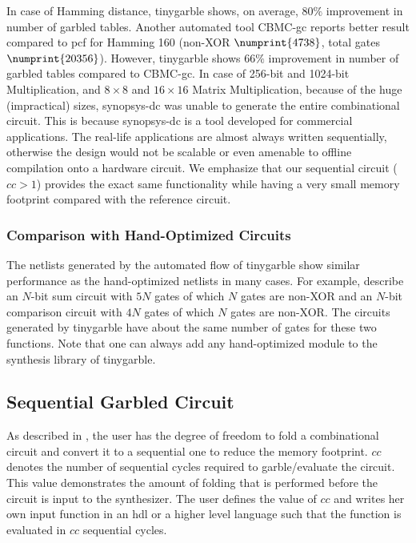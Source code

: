 In case of Hamming distance, \gls{tinygarble} shows, on average, $80\%$ improvement in number of garbled tables.
Another automated tool CBMC-\acrshort{gc} \cite{franz2014cbmc} reports better result compared to \gls{pcf} for Hamming 160 (non-XOR $\numprint{4738}$, total gates $\numprint{20356}$).
However, \gls{tinygarble} shows $66\%$ improvement in number of garbled tables compared to CBMC-\acrshort{gc}.
In case of 256-bit and 1024-bit Multiplication, and $8\times 8$ and $16\times 16$ Matrix Multiplication, because of the huge (impractical) sizes, \gls{synopsys-dc} was unable to generate the entire combinational circuit.
This is because \gls{synopsys-dc} is a tool developed for commercial applications.
The real-life applications are almost always written sequentially, otherwise the design would not be scalable or even amenable to offline compilation onto a hardware circuit.
We emphasize that our sequential circuit ($cc>1$) provides the exact same functionality while having a very small memory footprint compared with the reference circuit.

\subsubsection{Comparison with Hand-Optimized Circuits} \label{sssec:eval-tinygarble-comb-hand}
The \gls{netlist}s generated by the automated flow of \gls{tinygarble} show similar performance as the hand-optimized \gls{netlist}s in many cases.
For example, \cite{kolesnikov2009improved} describe an $N$-bit sum circuit with $5N$ gates of which $N$ gates are non-XOR and an $N$-bit comparison circuit with $4N$ gates of which $N$ gates are non-XOR.
The circuits generated by \gls{tinygarble} have about the same number of gates for these two functions.
Note that one can always add any hand-optimized module to the synthesis library of \gls{tinygarble}.

\subsection{Sequential Garbled Circuit}\label{ssec:eval-tinygarble-seq}
As described in , the user has the degree of freedom to fold a combinational circuit and convert it to a sequential one to reduce the memory footprint.
$cc$ denotes the number of sequential cycles required to garble/evaluate the circuit.
This value demonstrates the amount of folding that is performed before the circuit is input to the synthesizer.
The user defines the value of $cc$ and writes her own input function in an \acrshort{hdl} or a higher level language such that the function is evaluated in $cc$ sequential cycles.


